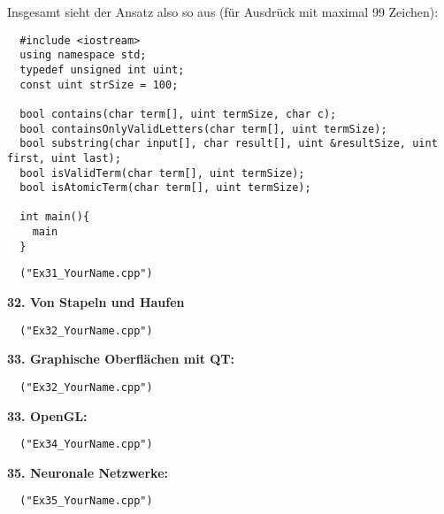 \documentclass[paper=A4, pagesize, DIV=calc, smallheadings,
fontsize=11pt, expansion=false]{scrreprt}
\begin{document}
Insgesamt sieht der Ansatz also so aus (für Ausdrück mit maximal 99 Zeichen):

\begin{verbatim}
  #include <iostream>
  using namespace std;
  typedef unsigned int uint;
  const uint strSize = 100;

  bool contains(char term[], uint termSize, char c);
  bool containsOnlyValidLetters(char term[], uint termSize);
  bool substring(char input[], char result[], uint &resultSize, uint first, uint last);
  bool isValidTerm(char term[], uint termSize);
  bool isAtomicTerm(char term[], uint termSize);

  int main(){
    main
  }
\end{verbatim}
\begin{verbatim}
  ("Ex31_YourName.cpp")
\end{verbatim}

\textbf{32. Von Stapeln und Haufen}\\
\begin{verbatim}
  ("Ex32_YourName.cpp")
\end{verbatim}

\textbf{33. Graphische Oberflächen mit QT:}\\
\begin{verbatim}
  ("Ex32_YourName.cpp")
\end{verbatim}

\textbf{33. OpenGL:}\\
\begin{verbatim}
  ("Ex34_YourName.cpp")
\end{verbatim}

\textbf{35. Neuronale Netzwerke:}\\
\begin{verbatim}
  ("Ex35_YourName.cpp")
\end{verbatim}
\end{document}
